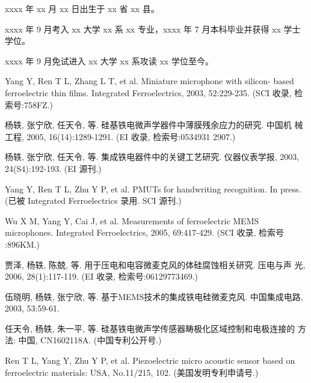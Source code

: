 \begin{resume}


  xxxx 年 xx 月 xx 日出生于 xx 省 xx 县。
  
  xxxx 年 9 月考入 xx 大学 xx 系 xx 专业，xxxx 年 7 月本科毕业并获得 xx 学士学位。
  
  xxxx 年 9 月免试进入 xx 大学 xx 系攻读 xx 学位至今。


  \begin{enumerate}[{[}1{]}]
  \item Yang Y, Ren T L, Zhang L T, et al. Miniature microphone with silicon-
    based ferroelectric thin films. Integrated Ferroelectrics, 2003,
    52:229-235. (SCI 收录, 检索号:758FZ.)
  \item 杨轶, 张宁欣, 任天令, 等. 硅基铁电微声学器件中薄膜残余应力的研究. 中国机
    械工程, 2005, 16(14):1289-1291. (EI 收录, 检索号:0534931 2907.)
  \item 杨轶, 张宁欣, 任天令, 等. 集成铁电器件中的关键工艺研究. 仪器仪表学报,
    2003, 24(S4):192-193. (EI 源刊.)
  \item Yang Y, Ren T L, Zhu Y P, et al. PMUTs for handwriting recognition. In
    press. (已被 Integrated Ferroelectrics 录用. SCI 源刊.)
  \item Wu X M, Yang Y, Cai J, et al. Measurements of ferroelectric MEMS
    microphones. Integrated Ferroelectrics, 2005, 69:417-429. (SCI 收录, 检索号
    :896KM.)
  \item 贾泽, 杨轶, 陈兢, 等. 用于压电和电容微麦克风的体硅腐蚀相关研究. 压电与声
    光, 2006, 28(1):117-119. (EI 收录, 检索号:06129773469.)
  \item 伍晓明, 杨轶, 张宁欣, 等. 基于MEMS技术的集成铁电硅微麦克风. 中国集成电路, 
    2003, 53:59-61.
  \end{enumerate}

  \begin{enumerate}[{[}1{]}]
  \item 任天令, 杨轶, 朱一平, 等. 硅基铁电微声学传感器畴极化区域控制和电极连接的
    方法: 中国, CN1602118A. (中国专利公开号.)
  \item Ren T L, Yang Y, Zhu Y P, et al. Piezoelectric micro acoustic sensor
    based on ferroelectric materials: USA, No.11/215, 102. (美国发明专利申请号.)
  \end{enumerate}
\end{resume}
